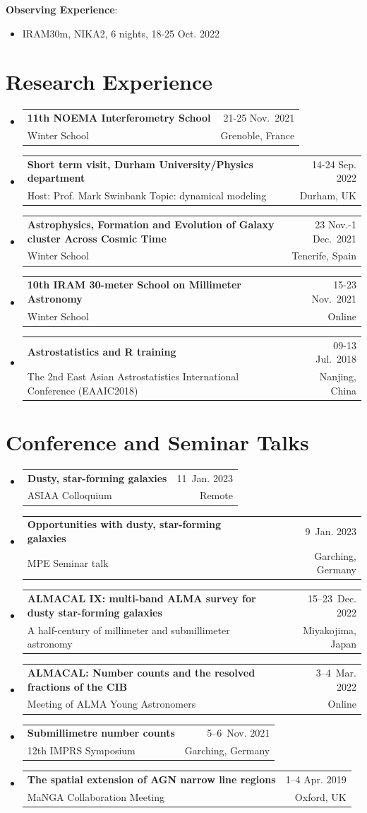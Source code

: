 \documentclass[A4,11pt]{article}
\makeatletter
\newcommand{\CVSubheading}[4]{
  \vspace{-2pt}\item
    \begin{tabular*}{0.97\textwidth}[t]{l@{\extracolsep{\fill}}r}
      \textbf{#1} & #2 \\
      \small#3 & \small #4 \\
    \end{tabular*}\vspace{-7pt}
}
\newcommand{\CVSubHeadingListStart}{\begin{itemize}[leftmargin=0.5cm, label={}]}
\newcommand{\CVSubHeadingListEnd}{\end{itemize}}
\newenvironment{paperlist}
{ \begin{itemize}[leftmargin=0.8cm, label={$\bullet$}]
    \setlength{\itemsep}{1pt}
    \setlength{\parskip}{1pt}
    \setlength{\parsep}{1pt}     }
{ \end{itemize}                  }
\makeatother
\begin{document}
{\bf Observing Experience}:\\
\vspace{-0.8em}
\begin{paperlist}
    \item IRAM30m, NIKA2, 6 nights, 18-25 Oct. 2022
\end{paperlist}

\section{Research Experience}
  \CVSubHeadingListStart
    \CVSubheading
      {11th NOEMA Interferometry School}{21-25 Nov.~2021}
      {Winter School}{Grenoble, France}
    \CVSubheading 
      {Short term visit, Durham University/Physics department}{14-24 Sep. 2022}
      {Host: Prof. Mark Swinbank Topic: dynamical modeling}{Durham, UK}
    \CVSubheading 
      {Astrophysics, Formation and Evolution of Galaxy cluster Across Cosmic Time}{23 Nov.-1 Dec.~2021}
      {Winter School}{Tenerife, Spain}
    \CVSubheading 
      {10th IRAM 30-meter School on Millimeter Astronomy}{15-23 Nov.~2021}
      {Winter School}{Online}
    \CVSubheading
      {Astrostatistics and R training}{09-13 Jul.~2018}
      {The 2nd East Asian Astrostatistics International Conference (EAAIC2018)}{Nanjing, China}
  \CVSubHeadingListEnd


\section{Conference and Seminar Talks}
  \CVSubHeadingListStart
    \CVSubheading
      {Dusty, star-forming galaxies}{11~Jan. 2023}
      {ASIAA Colloquium}{Remote}
    \CVSubheading
      {Opportunities with dusty, star-forming galaxies}{9~Jan. 2023}
      {MPE Seminar talk}{Garching, Germany}
    \CVSubheading
      {ALMACAL IX: multi-band ALMA survey for dusty star-forming galaxies}{15--23~Dec. 2022}
      {A half-century of millimeter and submillimeter astronomy}{Miyakojima, Japan}
    \CVSubheading
      {ALMACAL: Number counts and the resolved fractions of the CIB}{3--4~Mar. 2022}
      {Meeting of ALMA Young Astronomers}{Online}
    \CVSubheading
      {Submillimetre number counts}{5--6~Nov. 2021}
      {12th IMPRS Symposium}{Garching, Germany}
    \CVSubheading
      {The spatial extension of AGN narrow line regions}{1--4 Apr. 2019}
      {MaNGA Collaboration Meeting}{Oxford, UK}
  \CVSubHeadingListEnd
\end{document}
